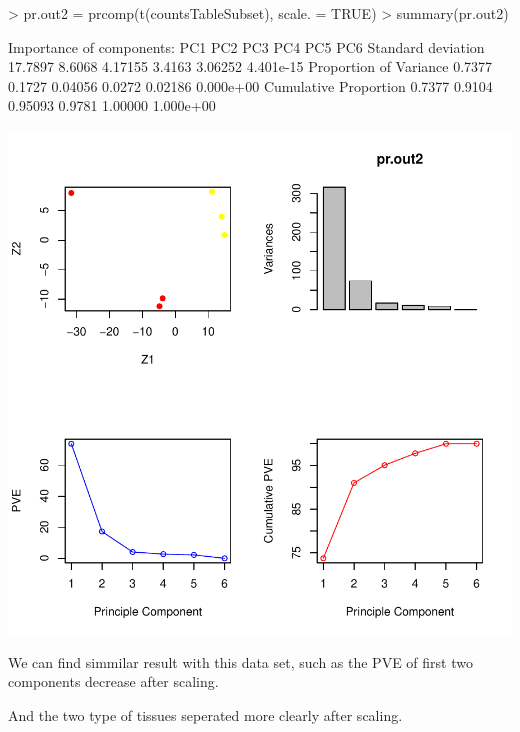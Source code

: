 \documentclass[a4paper]{article}
\begin{document}
\begin{Schunk}
\begin{Sinput}
> pr.out2 = prcomp(t(countsTableSubset), scale. = TRUE)
> summary(pr.out2)
\end{Sinput}
\begin{Soutput}
Importance of components:
                           PC1    PC2     PC3    PC4     PC5       PC6
Standard deviation     17.7897 8.6068 4.17155 3.4163 3.06252 4.401e-15
Proportion of Variance  0.7377 0.1727 0.04056 0.0272 0.02186 0.000e+00
Cumulative Proportion   0.7377 0.9104 0.95093 0.9781 1.00000 1.000e+00
\end{Soutput}
\end{Schunk}
\includegraphics{pca-1c2}

\begin{enumerate}
{\color{red}
\item We can find simmilar result with this data set, such as the PVE of first two components decrease after scaling.
\item And the two type of tissues seperated more clearly after scaling.
}
\end{enumerate}
\end{document}

